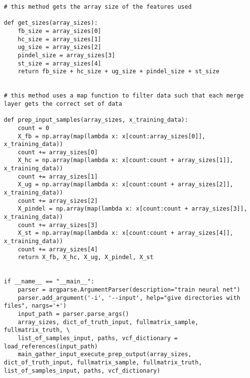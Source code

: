 \documentclass{article}
\begin{document}
\begin{verbatim}
# this method gets the array size of the features used

def get_sizes(array_sizes):
    fb_size = array_sizes[0]
    hc_size = array_sizes[1]
    ug_size = array_sizes[2]
    pindel_size = array_sizes[3]
    st_size = array_sizes[4]
    return fb_size + hc_size + ug_size + pindel_size + st_size

	
# this method uses a map function to filter data such that each merge layer gets the correct set of data

def prep_input_samples(array_sizes, x_training_data):
    count = 0
    X_fb = np.array(map(lambda x: x[count:array_sizes[0]], x_training_data))
    count += array_sizes[0]
    X_hc = np.array(map(lambda x: x[count:count + array_sizes[1]], x_training_data))
    count += array_sizes[1]
    X_ug = np.array(map(lambda x: x[count:count + array_sizes[2]], x_training_data))
    count += array_sizes[2]
    X_pindel = np.array(map(lambda x: x[count:count + array_sizes[3]], x_training_data))
    count += array_sizes[3]
    X_st = np.array(map(lambda x: x[count:count + array_sizes[4]], x_training_data))
    count += array_sizes[4]
    return X_fb, X_hc, X_ug, X_pindel, X_st


if __name__ == "__main__":
    parser = argparse.ArgumentParser(description="train neural net")
    parser.add_argument('-i', '--input', help="give directories with files", nargs='+')
    input_path = parser.parse_args()
    array_sizes, dict_of_truth_input, fullmatrix_sample, fullmatrix_truth, \
    list_of_samples_input, paths, vcf_dictionary = load_references(input_path)
    main_gather_input_execute_prep_output(array_sizes, dict_of_truth_input, fullmatrix_sample, fullmatrix_truth, list_of_samples_input, paths, vcf_dictionary)
\end{verbatim}
\end{document}

